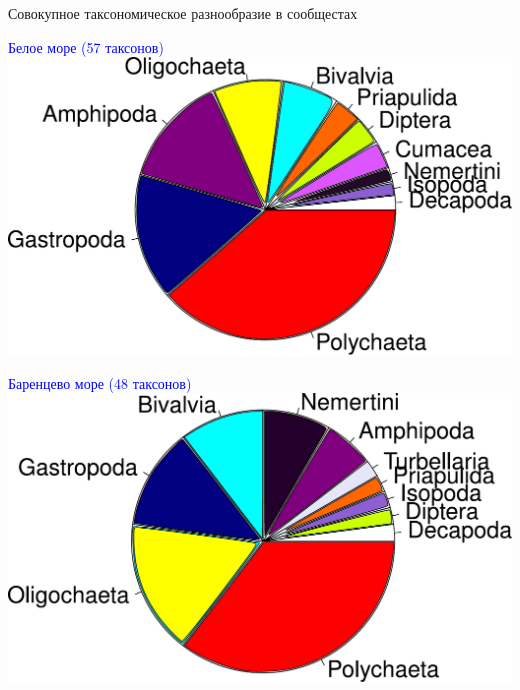 \documentclass{beamer}
\begin{document}
\begin{frame}{Совокупное таксономическое разнообразие в сообщестах}
		\begin{flushleft}
		\textcolor{blue}{\footnotesize Белое море (57 таксонов)}\\
			\includegraphics[height=0.34\textheight]{White_taxons_pie_big1.pdf}
		\end{flushleft}

		\begin{flushright}
		\textcolor{blue}{\footnotesize Баренцево море (48 таксонов)}\\
			\includegraphics[height=0.34\textheight]{Barents_taxons_pie_big1.pdf}
		\end{flushright}
\end{frame}


\end{document}
